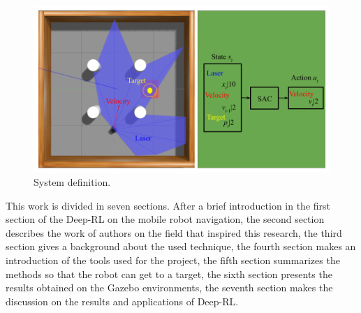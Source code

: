 \begin{figure}[htbp]
\centerline{\includegraphics[width=\columnwidth]{images/mapless.png}}
\caption{System definition.}
\label{fig:mapless}
\end{figure}

This work is divided in seven sections.
After a brief introduction in the first section of the Deep-RL on the mobile robot navigation, the second section describes the work of authors on the field that inspired this research, the third section gives a background about the used technique, the fourth section makes an introduction of the tools used for the project, the fifth section summarizes the methods so that the robot can get to a target, the sixth section presents the results obtained on the Gazebo environments, the seventh section makes the discussion on the results and applications of Deep-RL.
